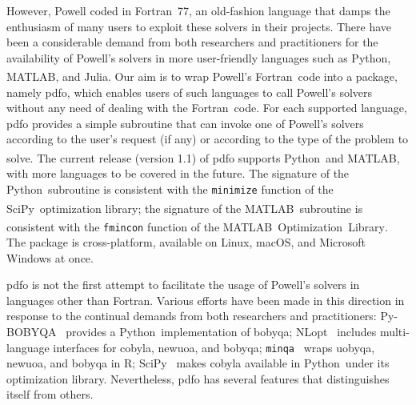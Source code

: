 \documentclass[11pt,draft]{article}
\numberwithin{equation}{section}
\def\R{\ensuremath{\mathds{R}}}
\def\matlabopt{\mbox{\matlab\ Optimization Library\textsuperscript{\texttrademark}}}
\def\R{\mbox{R}}
\def\fortran{\mbox{Fortran}}
\def\matlab{\mbox{MATLAB\textsuperscript{\textregistered}}}
\def\minqa{\mbox{\texttt{minqa}}}
\def\nlopt{\mbox{NLopt}}
\def\pybobyqa{\mbox{Py-BOBYQA}}
\def\python{\mbox{Python}}
\def\julia{\mbox{Julia}}
\def\scipy{\mbox{SciPy}}
\begin{document}
However, Powell coded in \fortran\ 77, an old-fashion language that damps the enthusiasm of many users to exploit these solvers in their projects.
There have been a considerable demand from both researchers and practitioners for the availability of Powell's solvers in more user-friendly languages such as \python, \matlab, and \julia.
Our aim is to wrap Powell's \fortran\ code into a package, namely \gls{pdfo}, which enables users of such languages to call Powell's solvers without any need of dealing with the \fortran\ code.
For each supported language, \gls{pdfo} provides a simple subroutine that can invoke one of Powell's solvers according to the user's request (if any) or according to the type of the problem to solve. The current release (version 1.1) of \gls{pdfo} supports \python\ and \matlab, with more languages to be covered in the future.
The signature of the \python\ subroutine is consistent with the \texttt{minimize} function of the \scipy\ optimization library;
the signature of the \matlab\ subroutine is consistent with the \texttt{fmincon} function of the \matlabopt.
The package is cross-platform, available on Linux, macOS, and Microsoft Windows at once.

\gls{pdfo} is not the first attempt to facilitate the usage of Powell's solvers in languages other than \fortran.
Various efforts have been made in this direction in response to the continual demands from both researchers and practitioners: \pybobyqa~\cite{Cartis_Etal_2019} provides a \python\ implementation of \gls{bobyqa}; \nlopt~\cite{Johnson_2019} includes multi-language interfaces for \gls{cobyla}, \gls{newuoa}, and \gls{bobyqa}; \minqa~\cite{Bates_Etal_2014} wraps \gls{uobyqa}, \gls{newuoa}, and \gls{bobyqa} in \R; \scipy~\cite{Virtanen_Etal_2020} makes \gls{cobyla} available in \python\ under its optimization library. Nevertheless, \gls{pdfo} has several features that distinguishes itself from others.
\end{document}

